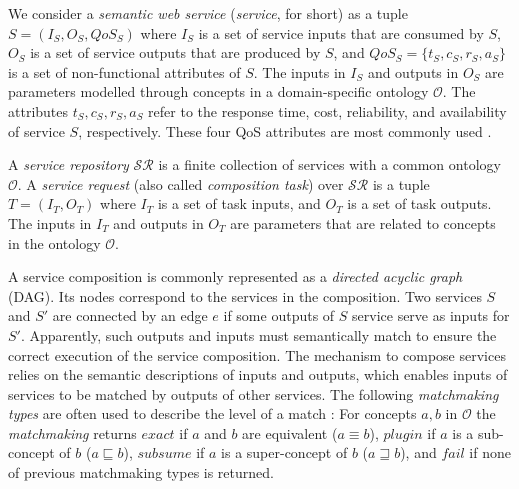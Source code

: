 \documentclass{llncs}
\begin{document}
We consider a \emph{semantic web service} (\emph{service}, for short) as a tuple $S = (I_{S}, O_{S}, QoS_S)$ where $I_{S}$ is a set of service inputs that are consumed by $S$, $O_{S}$ is a set of service outputs that are produced by $S$, and $QoS_{S}=\{t_S, c_S, r_S, a_S\}$ is a set of non-functional attributes of $S$. The inputs in $I_{S}$ and outputs in $O_{S}$ are parameters modelled through concepts in a domain-specific ontology $\mathcal{O}$. The attributes $t_S, c_S, r_S, a_S$ refer to the response time, cost, reliability, and availability of service $S$, respectively. These four QoS attributes are most commonly used \cite{zeng2003quality}.

A \emph{service repository} $\mathcal{SR}$ is a finite collection of services with a common ontology $\mathcal{O}$. A \emph{service request} (also called \emph{composition task}) over $\mathcal{SR}$ is a tuple $T=(I_{T}, O_{T})$ where $I_{T}$ is a set of task inputs, and $O_{T}$ is a set of task outputs. The inputs in $I_{T}$ and outputs in $O_{T}$ are parameters that are related to concepts in the ontology $\mathcal{O}$.

A service composition is commonly represented as a \emph{directed acyclic graph} (DAG). Its nodes correspond to the services in the composition. Two services $S$ and $S'$ are connected by an edge $e$ if some outputs of $S$ service serve as inputs for $S'$. Apparently, such outputs and inputs must semantically match to ensure the correct execution of the service composition. The mechanism to compose services relies on the semantic descriptions of inputs and outputs, which enables inputs of services to be matched by outputs of other services. The following \emph{matchmaking types} are often used to describe the level of a match \cite{paolucci2002semantic}: For concepts $a, b$ in $\mathcal{O}$ the \emph{matchmaking} returns $exact$ if $a$ and $b$ are equivalent ($a \equiv b$), $plugin$ if $a$ is a sub-concept of $b$ ($a \sqsubseteq b$), $subsume$ if $a$ is a super-concept of $b$ ($a \sqsupseteq b$), and $fail$ if none of previous matchmaking types is returned.
\end{document}
